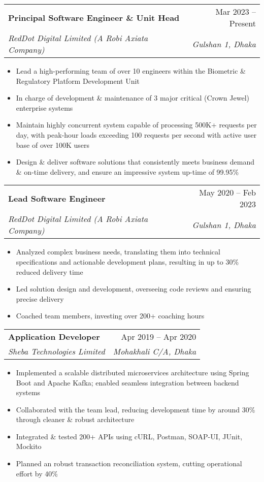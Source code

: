 \documentclass[letterpaper,11pt]{article}
\makeatletter
\newcommand{\resumeItem}[1]{
  \item\small{
    {#1 \vspace{-2pt}}
  }
}
\newcommand{\resumeSubheading}[4]{
  \vspace{-2pt}\item
    \begin{tabular*}{0.97\textwidth}[t]{l@{\extracolsep{\fill}}r}
      \textbf{#1} & #2 \\
      \textit{\small#3} & \textit{\small #4} \\
    \end{tabular*}\vspace{-7pt}
}
\newcommand{\resumeSubSubheading}[2]{
    \item
    \begin{tabular*}{0.97\textwidth}{l@{\extracolsep{\fill}}r}
      \textit{\small#1} & \textit{\small #2} \\
    \end{tabular*}\vspace{-7pt}
}
\newcommand{\resumeSubHeadingListEnd}{\end{itemize}}
\newcommand{\resumeItemListStart}{\begin{itemize}}
\newcommand{\resumeItemListEnd}{\end{itemize}\vspace{-5pt}}
\makeatother
\begin{document}
    \resumeSubheading
      {Principal Software Engineer \& Unit Head}{Mar 2023 -- Present}{RedDot Digital Limited (A Robi Axiata Company)}{Gulshan 1, Dhaka}
      \resumeItemListStart
        \resumeItem{Lead a high-performing team of over 10 engineers within the Biometric \& Regulatory Platform Development Unit}
        \resumeItem{In charge of development \& maintenance of 3 major critical (Crown Jewel) enterprise systems}
        \resumeItem{Maintain highly concurrent system capable of processing 500K+ requests per day, with peak-hour loads exceeding 100 requests per second with active user base of over 100K users}
        \resumeItem{Design \& deliver software solutions that consistently meets business demand \& on-time delivery, and ensure an impressive system up-time of 99.95\%}
      \resumeItemListEnd

  \resumeSubheading
      {Lead Software Engineer}{May 2020 -- Feb 2023}{RedDot Digital Limited (A Robi Axiata Company)}{Gulshan 1, Dhaka}
      \resumeItemListStart
        \resumeItem{Analyzed complex business needs, translating them into technical specifications and actionable development plans, resulting in up to 30\% reduced delivery time}
        \resumeItem{Led solution design and development, overseeing code reviews and ensuring precise delivery}
        \resumeItem{Coached team members, investing over 200+ coaching hours}
      \resumeItemListEnd
      

    \resumeSubheading
      {Application Developer}{Apr 2019 -- Apr 2020}
      {Sheba Technologies Limited}{Mohakhali C/A, Dhaka}
      \resumeItemListStart
        \resumeItem{Implemented a scalable distributed microservices architecture using Spring Boot and Apache Kafka; enabled seamless integration between backend systems}
        \resumeItem{Collaborated with the team lead, reducing development time by around 30\% through cleaner \& robust architecture}
        \resumeItem{Integrated \& tested 200+ APIs using cURL, Postman, SOAP-UI, JUnit, Mockito}
        \resumeItem{Planned an robust transaction reconciliation system, cutting operational effort by 40\%}
    \resumeItemListEnd
\end{document}
